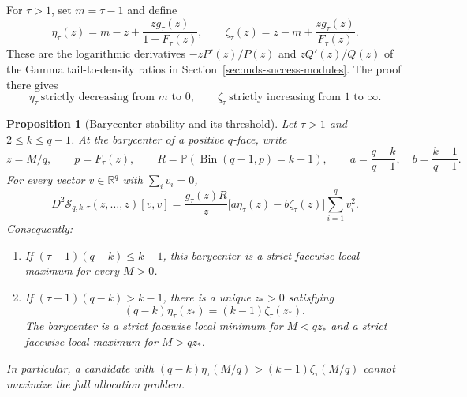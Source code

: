 \documentclass[11pt]{article}
\newtheorem{proposition}{Proposition}
\theoremstyle{definition}
\theoremstyle{remark}
\DeclareMathOperator{\Bin}{Bin}
\newcommand{\Pbb}{\mathbb P}
\newcommand{\R}{\mathbb R}
\newcommand{\1}{\mathbf 1}
\begin{document}
For \(\tau>1\), set \(m=\tau-1\) and define
\begin{equation}\label{eq:mds-stability-elasticities}
  \eta_\tau(z)=m-z+\frac{z g_\tau(z)}{1-F_\tau(z)},
  \qquad
  \zeta_\tau(z)=z-m+\frac{z g_\tau(z)}{F_\tau(z)}.
\end{equation}
These are the logarithmic derivatives
\(-zP'(z)/P(z)\) and \(zQ'(z)/Q(z)\) of the Gamma tail-to-density
ratios in Section~\ref{sec:mds-success-modules}.  The proof there gives
\[
  \eta_\tau\ \text{strictly decreasing from }m\text{ to }0,
  \qquad
  \zeta_\tau\ \text{strictly increasing from }1\text{ to }\infty.
\]

\begin{proposition}[Barycenter stability and its threshold]
\label{prop:mds-barycenter-stability}
Let \(\tau>1\) and \(2\le k\le q-1\).  At the barycenter of a
positive \(q\)-face, write
\[
  z=M/q,\qquad p=F_\tau(z),\qquad
  R=\Pbb(\Bin(q-1,p)=k-1),
  \qquad
  a=\frac{q-k}{q-1},\quad b=\frac{k-1}{q-1}.
\]
For every vector \(v\in\R^q\) with \(\sum_i v_i=0\),
\begin{equation}\label{eq:mds-barycenter-hessian}
  D^2\mathcal S_{q,k,\tau}(z,\ldots,z)[v,v]
  =\frac{g_\tau(z)R}{z}
    \bigl[a\eta_\tau(z)-b\zeta_\tau(z)\bigr]
    \sum_{i=1}^q v_i^2.
\end{equation}
Consequently:
\begin{enumerate}[label=(\roman*)]
  \item If \((\tau-1)(q-k)\le k-1\), this barycenter is a strict
  facewise local maximum for every \(M>0\).
  \item If \((\tau-1)(q-k)>k-1\), there is a unique \(z_*>0\)
  satisfying
  \begin{equation}\label{eq:mds-stability-threshold}
    (q-k)\eta_\tau(z_*)=(k-1)\zeta_\tau(z_*).
  \end{equation}
  The barycenter is a strict facewise local minimum for \(M<qz_*\)
  and a strict facewise local maximum for \(M>qz_*\).
\end{enumerate}
In particular, a candidate with
\((q-k)\eta_\tau(M/q)>(k-1)\zeta_\tau(M/q)\) cannot maximize
the full allocation problem.
\end{proposition}
\end{document}
